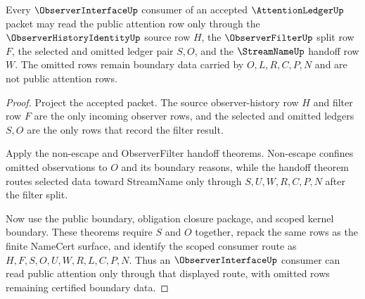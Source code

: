 \begin{theorem}
\label{thm:attention-ledger-observer-interface-handoff}
Every $\ObserverInterfaceUp$ consumer of an accepted $\AttentionLedgerUp$ packet may read the public attention row only through the $\ObserverHistoryIdentityUp$ source row $H$, the $\ObserverFilterUp$ split row $F$, the selected and omitted ledger pair $S,O$, and the $\StreamNameUp$ handoff row $W$. The omitted rows remain boundary data carried by $O,L,R,C,P,N$ and are not public attention rows.
\end{theorem}
\begin{proof}
Project the accepted packet. The source observer-history row $H$ and filter row $F$ are the only incoming observer rows, and the selected and omitted ledgers $S,O$ are the only rows that record the filter result.

Apply the non-escape and ObserverFilter handoff theorems. Non-escape confines omitted observations to $O$ and its boundary reasons, while the handoff theorem routes selected data toward StreamName only through $S,U,W,R,C,P,N$ after the filter split.

Now use the public boundary, obligation closure package, and scoped kernel boundary. These theorems require $S$ and $O$ together, repack the same rows as the finite NameCert surface, and identify the scoped consumer route as $H,F,S,O,U,W,R,L,C,P,N$. Thus an $\ObserverInterfaceUp$ consumer can read public attention only through that displayed route, with omitted rows remaining certified boundary data.
\end{proof}

